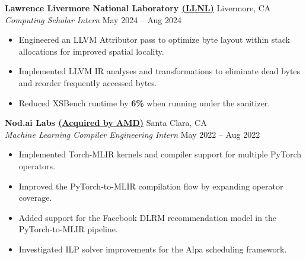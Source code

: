 \documentclass[10pt,letterpaper]{article}
\begin{document}
\textbf{Lawrence Livermore National Laboratory \textcolor{ultramarineblue}{\href{https://www.llnl.gov/}{(LLNL)}}} \hfill Livermore, CA\\
\textit{Computing Scholar Intern} \hfill May 2024 -- Aug 2024
\begin{itemize}
  \item Engineered an LLVM Attributor pass to optimize byte layout within stack allocations for improved spatial locality.
  \item Implemented LLVM IR analyses and transformations to eliminate dead bytes and reorder frequently accessed bytes.
  \item Reduced XSBench runtime by \textbf{6\%} when running under the sanitizer.
\end{itemize}

\textbf{Nod.ai Labs \textcolor{ultramarineblue}{\href{https://www.amd.com/en/newsroom/press-releases/2023-10-10-amd-to-acquire-open-source-ai-software-expert-nod-.html}{(Acquired by AMD)}}} \hfill Santa Clara, CA\\
\textit{Machine Learning Compiler Engineering Intern} \hfill May 2022 -- Aug 2022
\begin{itemize}
  \item Implemented Torch-MLIR kernels and compiler support for multiple PyTorch operators.
  \item Improved the PyTorch-to-MLIR compilation flow by expanding operator coverage.
  \item Added support for the Facebook DLRM recommendation model in the PyTorch-to-MLIR pipeline.
  \item Investigated ILP solver improvements for the Alpa scheduling framework.
\end{itemize}
\end{document}

